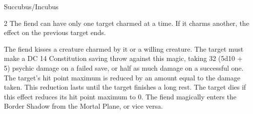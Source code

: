 \begin{DndMonster}[width=\textwidth + 8pt]{Succubus/Incubus}
\begin{multicols}{2}
The fiend can have only one target charmed at a time. If it charms another, the effect on the previous target ends.

The fiend kisses a creature charmed by it or a willing creature. The target must make a DC 14 Constitution saving throw against this magic, taking 32 (5d10 + 5) psychic damage on a failed save, or half as much damage on a successful one. The target's hit point maximum is reduced by an amount equal to the damage taken. This reduction lasts until the target finishes a long rest. The target dies if this effect reduces its hit point maximum to 0.
The fiend magically enters the Border Shadow from the Mortal Plane, or vice versa.
\end{multicols}
\end{DndMonster}

